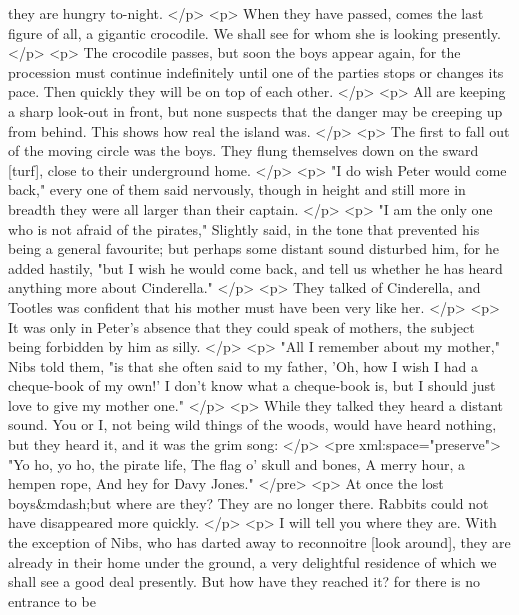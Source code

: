       they are hungry to-night.
    </p>
    <p>
      When they have passed, comes the last figure of all, a gigantic crocodile.
      We shall see for whom she is looking presently.
    </p>
    <p>
      The crocodile passes, but soon the boys appear again, for the procession
      must continue indefinitely until one of the parties stops or changes its
      pace. Then quickly they will be on top of each other.
    </p>
    <p>
      All are keeping a sharp look-out in front, but none suspects that the
      danger may be creeping up from behind. This shows how real the island was.
    </p>
    <p>
      The first to fall out of the moving circle was the boys. They flung
      themselves down on the sward [turf], close to their underground home.
    </p>
    <p>
      "I do wish Peter would come back," every one of them said nervously,
      though in height and still more in breadth they were all larger than their
      captain.
    </p>
    <p>
      "I am the only one who is not afraid of the pirates," Slightly said, in
      the tone that prevented his being a general favourite; but perhaps some
      distant sound disturbed him, for he added hastily, "but I wish he would
      come back, and tell us whether he has heard anything more about
      Cinderella."
    </p>
    <p>
      They talked of Cinderella, and Tootles was confident that his mother must
      have been very like her.
    </p>
    <p>
      It was only in Peter's absence that they could speak of mothers, the
      subject being forbidden by him as silly.
    </p>
    <p>
      "All I remember about my mother," Nibs told them, "is that she often said
      to my father, 'Oh, how I wish I had a cheque-book of my own!' I don't know
      what a cheque-book is, but I should just love to give my mother one."
    </p>
    <p>
      While they talked they heard a distant sound. You or I, not being wild
      things of the woods, would have heard nothing, but they heard it, and it
      was the grim song:
    </p>
<pre xml:space="preserve">
     "Yo ho, yo ho, the pirate life,
     The flag o' skull and bones,
     A merry hour, a hempen rope,
     And hey for Davy Jones."
</pre>
    <p>
      At once the lost boys&mdash;but where are they? They are no longer there.
      Rabbits could not have disappeared more quickly.
    </p>
    <p>
      I will tell you where they are. With the exception of Nibs, who has darted
      away to reconnoitre [look around], they are already in their home under
      the ground, a very delightful residence of which we shall see a good deal
      presently. But how have they reached it? for there is no entrance to be
